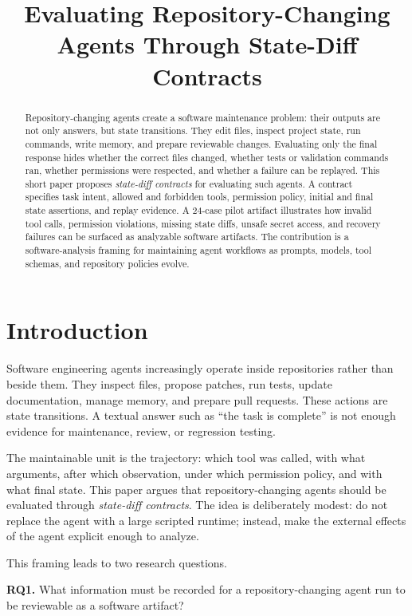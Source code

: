 \documentclass[10pt,conference]{IEEEtran}
\title{Evaluating Repository-Changing Agents Through State-Diff Contracts}
\author{\IEEEauthorblockN{Anonymous Author(s)}}
\begin{document}
\maketitle

\begin{abstract}
Repository-changing agents create a software maintenance problem: their outputs
are not only answers, but state transitions. They edit files, inspect project
state, run commands, write memory, and prepare reviewable changes. Evaluating
only the final response hides whether the correct files changed, whether tests
or validation commands ran, whether permissions were respected, and whether a
failure can be replayed. This short paper proposes \emph{state-diff contracts}
for evaluating such agents. A contract specifies task intent, allowed and
forbidden tools, permission policy, initial and final state assertions, and
replay evidence. A 24-case pilot artifact illustrates how invalid tool calls,
permission violations, missing state diffs, unsafe secret access, and recovery
failures can be surfaced as analyzable software artifacts. The contribution is
a software-analysis framing for maintaining agent workflows as prompts, models,
tool schemas, and repository policies evolve.
\end{abstract}

\section{Introduction}

Software engineering agents increasingly operate inside repositories rather
than beside them. They inspect files, propose patches, run tests, update
documentation, manage memory, and prepare pull requests. These actions are
state transitions. A textual answer such as ``the task is complete'' is not
enough evidence for maintenance, review, or regression testing.

The maintainable unit is the trajectory: which tool was called, with what
arguments, after which observation, under which permission policy, and with
what final state. This paper argues that repository-changing agents should be
evaluated through \emph{state-diff contracts}. The idea is deliberately modest:
do not replace the agent with a large scripted runtime; instead, make the
external effects of the agent explicit enough to analyze.

This framing leads to two research questions.

\textbf{RQ1.} What information must be recorded for a repository-changing
agent run to be reviewable as a software artifact?
\end{document}
